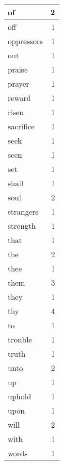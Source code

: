 \begin{center}
\begin{longtable}{l|r}
of & 2 \\ \hline
off & 1 \\ \hline
oppressors & 1 \\ \hline
out & 1 \\ \hline
praise & 1 \\ \hline
prayer & 1 \\ \hline
reward & 1 \\ \hline
risen & 1 \\ \hline
sacrifice & 1 \\ \hline
seek & 1 \\ \hline
seen & 1 \\ \hline
set & 1 \\ \hline
shall & 1 \\ \hline
soul & 2 \\ \hline
strangers & 1 \\ \hline
strength & 1 \\ \hline
that & 1 \\ \hline
the & 2 \\ \hline
thee & 1 \\ \hline
them & 3 \\ \hline
they & 1 \\ \hline
thy & 4 \\ \hline
to & 1 \\ \hline
trouble & 1 \\ \hline
truth & 1 \\ \hline
unto & 2 \\ \hline
up & 1 \\ \hline
uphold & 1 \\ \hline
upon & 1 \\ \hline
will & 2 \\ \hline
with & 1 \\ \hline
words & 1 \\ \hline
\end{longtable}
\end{center}



\normalsize



